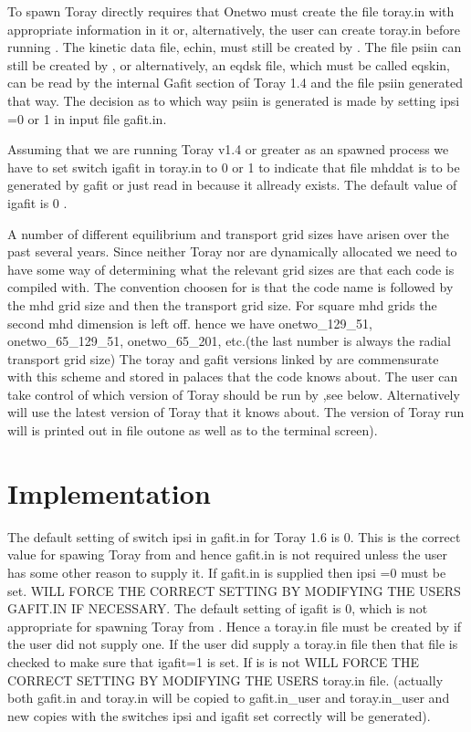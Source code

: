 \documentclass[12pt]{article}
\begin{document}
     To spawn Toray directly requires that Onetwo
     must create the file toray.in with appropriate information in it
     or, alternatively, the user can create toray.in before running
     \ot. The kinetic data file, echin, must still be created by \ot.
     The file psiin can still be created by \ot, or alternatively,
     an eqdsk file, which must be  called eqskin, can be
     read by the internal Gafit
     section of Toray 1.4 and the file psiin generated that way.
     The decision as to which way psiin is generated  is made by setting
     ipsi =0 or 1 in input file gafit.in. 
 
     Assuming that we are running Toray v1.4 or greater as an \ot spawned
     process we have to set switch igafit in toray.in to 0 or 1 to indicate
     that file mhddat is to be generated by gafit or just read in
     because  it allready exists. The default value of igafit is
     0 .

     A number of different equilibrium and transport grid sizes 
     have arisen over the past several years. Since neither Toray nor
     \ot are dynamically allocated we need to have some way of
     determining what the relevant grid sizes are that each code is
     compiled with. The convention choosen for \ot is that the code
     name is followed by the mhd grid size and then the transport grid
     size. For square mhd grids the second mhd dimension is left off.
     hence we have onetwo\_129\_51, onetwo\_65\_129\_51, onetwo\_65\_201,
     etc.(the last number is always the radial transport grid size)
      The toray and gafit versions linked by \ot are 
     commensurate with this scheme and  stored in palaces that the
     \ot code knows about. The user can take control of which version
     of Toray should be run by \ot,see below. Alternatively \ot will
     use the latest version of Toray that it knows about.
     The version of Toray run will is  printed out 
     in file outone as well as to  the terminal screen).

  \section{Implementation}
     The default setting of switch ipsi in gafit.in  for Toray 1.6 is
     0. This is the correct value for spawing Toray from \ot and hence
     gafit.in is not required unless the user has some other reason
     to supply it. If gafit.in is supplied then ipsi =0 must be set.
     \ot WILL FORCE THE CORRECT SETTING BY MODIFYING THE USERS
     GAFIT.IN IF NECESSARY. The default setting of igafit is 0, which
     is not appropriate for spawning Toray from \ot. Hence a toray.in
     file must be created by \ot if the user did not supply one. If
     the user did supply a toray.in file then that file is checked to
     make sure that igafit=1 is set. If is is not \ot WILL FORCE THE
     CORRECT SETTING BY MODIFYING THE USERS toray.in file. (actually
     both gafit.in and toray.in will be copied to gafit.in\_user
     and toray.in\_user and new copies with the switches ipsi and
     igafit set correctly will be generated).
\end{document}

